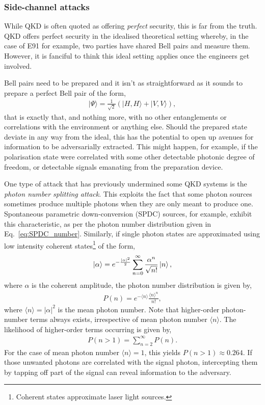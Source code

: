 \subsubsection{Side-channel attacks} \label{side-channel-attacks-qkd}

While QKD is often quoted as offering \emph{perfect} security, this is far from the truth. QKD offers perfect security in the idealised theoretical setting whereby, in the case of E91 for example, two parties have shared Bell pairs and measure them. However, it is fanciful to think this ideal setting applies once the engineers get involved.

Bell pairs need to be prepared and it isn't as straightforward as it sounds to prepare a perfect Bell pair of the form,
\begin{align}
	|\Psi\rangle = \frac{1}{\sqrt{2}}(|H,H\rangle+|V,V\rangle),
\end{align}
that is exactly that, and nothing more, with no other entanglements or correlations with the environment or anything else. Should the prepared state deviate in any way from the ideal, this has the potential to open up avenues for information to be adversarially extracted. This might happen, for example, if the polarisation state were correlated with some other detectable photonic degree of freedom, or detectable signals emanating from the preparation device.

One type of attack that has previously undermined some QKD systems is the \emph{photon number splitting attack}. This exploits the fact that some photon sources sometimes produce multiple photons when they are only meant to produce one. Spontaneous parametric down-conversion (SPDC) sources, for example, exhibit this characteristic, as per the photon number distribution given in Eq.~\eqref{eq:SPDC_number}. Similarly, if single photon states are approximated using low intensity coherent states\footnote{Coherent states approximate laser light sources.} of the form,
\begin{align}
	\ket\alpha = e^{-\frac{|\alpha|^2}{2}} \sum_{n=0}^\infty \frac{\alpha^n}{\sqrt{n!}}\ket{n},
\end{align}
where $\alpha$ is the coherent amplitude, the photon number distribution is given by,
\begin{align}
	P(n) = e^{-\langle n\rangle}\frac{\langle n\rangle^n}{n!},	
\end{align}
where $\langle n\rangle=|\alpha|^2$ is the mean photon number. Note that higher-order photon-number terms always exists, irrespective of mean photon number $\langle n\rangle$. The likelihood of higher-order terms occurring is given by,
\begin{align}
	P(n>1) = \sum_{n=2}^\infty P(n).
\end{align}
For the case of mean photon number $\langle n\rangle=1$, this yields $P(n>1)\approx 0.264$. If those unwanted photons are correlated with the signal photon, intercepting them by tapping off part of the signal can reveal information to the adversary.

